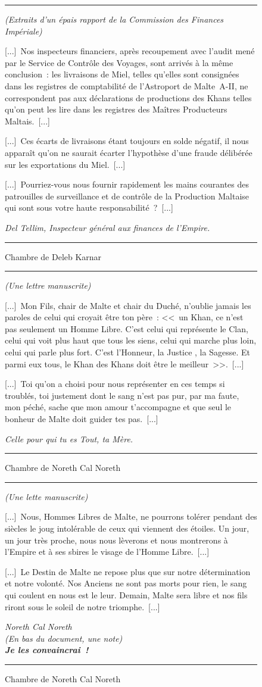 \documentclass{article}
\newcommand{\newcharacter}{\clearpage\setcounter{figure}{0}}
\newcommand{\indice}[4]{
  \begin{figure}[H]
    \begin{center}
      \rule{0.5\textwidth}{1pt}
    \end{center}
    \begin{framed}
      \begin{samepage}
        \textit{#1}
        \nopagebreak

        #2

        \nopagebreak

        \hfill\textit{#3}
      \end{samepage}
    \end{framed}
    \caption{#4}
    \begin{center}
      \rule{0.5\textwidth}{1pt}
    \end{center}
  \end{figure}
}
\begin{document}
\indice
{(Extraits d'un épais rapport de la Commission des Finances Impériale)}
{[...]~Nos inspecteurs financiers, après recoupement avec l'audit mené par le
Service de Contrôle des Voyages, sont arrivés à la même conclusion~: les
livraisons de Miel, telles qu'elles sont consignées dans les registres de
comptabilité de l'Astroport de Malte~A-II, ne correspondent pas aux
déclarations de productions des Khans telles qu'on peut les lire dans les
registres des Maîtres Producteurs Maltais.~[...]

\nobreak

[...]~Ces écarts de livraisons étant toujours en solde négatif, il nous
apparaît qu'on ne saurait écarter l'hypothèse d'une fraude délibérée sur les
exportations du Miel.~[...]

\nobreak

[...]~Pourriez-vous nous fournir rapidement les mains courantes des patrouilles
de surveillance et de contrôle de la Production Maltaise qui sont sous votre
haute responsabilité~?~[...]}
{Del Tellim, Inspecteur général aux finances de l'Empire.}
{Chambre de Deleb Karnar}

\newcharacter

\indice
{(Une lettre manuscrite)}
{[...]~Mon Fils, chair de Malte et chair du Duché, n'oublie jamais les paroles
de celui qui croyait être ton père~: <<~un Khan, ce n'est pas seulement un
Homme Libre. C'est celui qui représente le Clan, celui qui voit plus haut que
tous les siens, celui qui marche plus loin, celui qui parle plus fort. C'est
l'Honneur, la Justice , la Sagesse. Et parmi eux tous, le Khan des Khans doit
être le meilleur~>>.~[...]

\nobreak

[...]~Toi qu'on a choisi pour nous représenter en ces temps si troublés, toi
justement dont le sang n'est pas pur, par ma faute, mon péché, sache que mon
amour t'accompagne et que seul le bonheur de Malte doit guider tes
pas.~[...]}
{Celle pour qui tu es Tout, ta Mère.}
{Chambre de Noreth Cal Noreth}

\indice
{(Une lette manuscrite)}
{[...]~Nous, Hommes Libres de Malte, ne pourrons tolérer pendant des siècles le
joug intolérable de ceux qui viennent des étoiles. Un jour, un jour très
proche, nous nous lèverons et nous montrerons à l'Empire et à ses sbires le
visage de l'Homme Libre.~[...]

\nobreak

[...]~Le Destin de Malte ne repose plus que sur notre détermination et notre
volonté. Nos Anciens ne sont pas morts pour rien, le sang qui coulent en nous
est le leur. Demain, Malte sera libre et nos fils riront sous le soleil de
notre triomphe.~[...]}
{Noreth Cal Noreth\\
(En bas du document, une note)\\
\textbf{Je les convaincrai~!}}
{Chambre de Noreth Cal Noreth}
\end{document}

